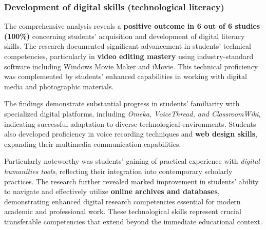 \documentclass[
hf,
]{ceurart}
\begin{document}
\subsubsection{Development of digital skills (technological literacy)}

The comprehensive analysis reveals a \textbf{positive outcome in 6 out of 6 studies (100\%)} concerning students' acquisition and development of digital literacy skills. The research documented significant advancement in students' technical competencies, particularly in \textbf{video editing mastery} using industry-standard software including Windows Movie Maker and iMovie. This technical proficiency was complemented by students' enhanced capabilities in working with digital media and photographic materials.

The findings demonstrate substantial progress in students' familiarity with specialized digital platforms, including \textit{Omeka, VoiceThread, and ClassroomWiki}, indicating successful adaptation to diverse technological environments. Students also developed proficiency in voice recording techniques and \textbf{web design skills}, expanding their multimedia communication capabilities.

Particularly noteworthy was students' gaining of practical experience with \textit{digital humanities tools}, reflecting their integration into contemporary scholarly practices. The research further revealed marked improvement in students' ability to navigate and effectively utilize \textbf{online archives and databases}, demonstrating enhanced digital research competencies essential for modern academic and professional work. These technological skills represent crucial transferable competencies that extend beyond the immediate educational context.
\end{document}
